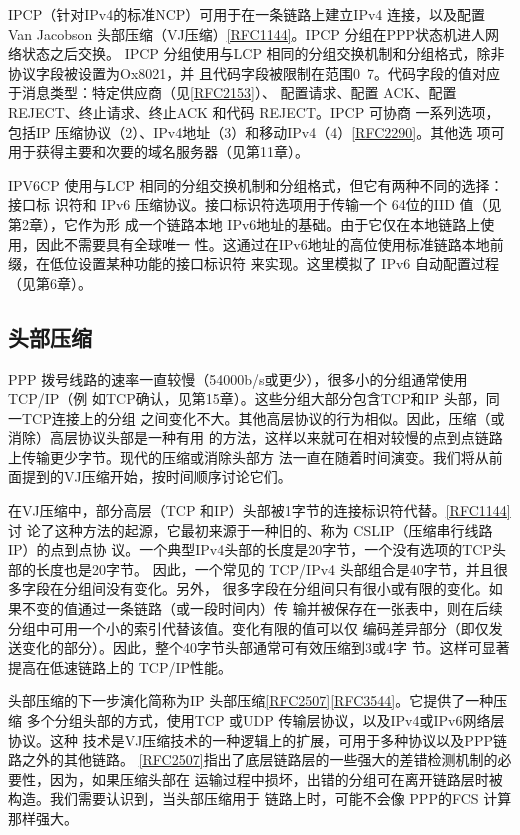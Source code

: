 IPCP（针对IPv4的标准NCP）可用于在一条链路上建立IPv4 连接，以及配置 Van
Jacobson
头部压缩（VJ压缩）\href{https://www.rfc-editor.org/rfc/rfc1144}{[RFC1144]}。IPCP
分组在PPP状态机进人网络状态之后交换。
IPCP 分组使用与LCP 相同的分组交换机制和分组格式，除非协议字段被设置为Ox8021，并
且代码字段被限制在范围0~7。代码字段的值对应于消息类型：特定供应商（见\href{https://www.rfc-editor.org/rfc/rfc2153}{[RFC2153]}）、
配置请求、配置 ACK、配置 REJECT、终止请求、终止ACK 和代码 REJECT。IPCP 可协商
一系列选项，包括IP
压缩协议（2）、IPv4地址（3）和移动IPv4（4）\href{https://www.rfc-editor.org/rfc/rfc2290}{[RFC2290]}。其他选
项可用于获得主要和次要的域名服务器（见第11章）。

IPV6CP 使用与LCP 相同的分组交换机制和分组格式，但它有两种不同的选择：接口标
识符和 IPv6 压缩协议。接口标识符选项用于传输一个 64位的IID 值（见第2章），它作为形
成一个链路本地 IPv6地址的基础。由于它仅在本地链路上使用，因此不需要具有全球唯一
性。这通过在IPv6地址的高位使用标准链路本地前缀，在低位设置某种功能的接口标识符
来实现。这里模拟了 IPv6 自动配置过程（见第6章）。

\subsection{头部压缩}

PPP 拨号线路的速率一直较慢（54000b/s或更少），很多小的分组通常使用TCP/IP（例
如TCP确认，见第15章）。这些分组大部分包含TCP和IP 头部，同一TCP连接上的分组
之间变化不大。其他高层协议的行为相似。因此，压缩（或消除）高层协议头部是一种有用
的方法，这样以来就可在相对较慢的点到点链路上传输更少字节。现代的压缩或消除头部方
法一直在随着时间演变。我们将从前面提到的VJ压缩开始，按时间顺序讨论它们。

在VJ压缩中，部分高层（TCP
和IP）头部被1字节的连接标识符代替。\href{https://www.rfc-editor.org/rfc/rfc1144}{[RFC1144]}讨
论了这种方法的起源，它最初来源于一种旧的、称为 CSLIP（压缩串行线路IP）的点到点协
议。一个典型IPv4头部的长度是20字节，一个没有选项的TCP头部的长度也是20字节。
因此，一个常见的 TCP/IPv4 头部组合是40字节，并且很多字段在分组间没有变化。另外，
很多字段在分组间只有很小或有限的变化。如果不变的值通过一条链路（或一段时间内）传
输并被保存在一张表中，则在后续分组中可用一个小的索引代替该值。变化有限的值可以仅
编码差异部分（即仅发送变化的部分）。因此，整个40字节头部通常可有效压缩到3或4字
节。这样可显著提高在低速链路上的 TCP/IP性能。

头部压缩的下一步演化简称为IP
头部压缩\href{https://www.rfc-editor.org/rfc/rfc2507}{[RFC2507]}\href{https://www.rfc-editor.org/rfc/rfc3544}{[RFC3544]}。它提供了一种压缩
多个分组头部的方式，使用TCP 或UDP 传输层协议，以及IPv4或IPv6网络层协议。这种
技术是VJ压缩技术的一种逻辑上的扩展，可用于多种协议以及PPP链路之外的其他链路。
\href{https://www.rfc-editor.org/rfc/rfc2507}{[RFC2507]}指出了底层链路层的一些强大的差错检测机制的必要性，因为，如果压缩头部在
运输过程中损坏，出错的分组可在离开链路层时被构造。我们需要认识到，当头部压缩用于
链路上时，可能不会像 PPP的FCS 计算那样强大。

